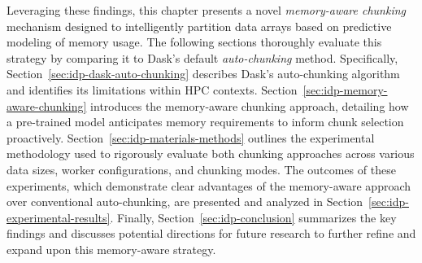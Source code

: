 Leveraging these findings, this chapter presents a novel \emph{memory-aware chunking} mechanism designed to intelligently partition data arrays based on predictive modeling of memory usage.
The following sections thoroughly evaluate this strategy by comparing it to Dask's default \emph{auto-chunking} method.
Specifically, Section~\ref{sec:idp-dask-auto-chunking} describes Dask's auto-chunking algorithm and identifies its limitations within \ac{HPC} contexts.
Section~\ref{sec:idp-memory-aware-chunking} introduces the memory-aware chunking approach, detailing how a pre-trained model anticipates memory requirements to inform chunk selection proactively.
Section~\ref{sec:idp-materials-methods} outlines the experimental methodology used to rigorously evaluate both chunking approaches across various data sizes, worker configurations, and chunking modes.
The outcomes of these experiments, which demonstrate clear advantages of the memory-aware approach over conventional auto-chunking, are presented and analyzed in Section~\ref{sec:idp-experimental-results}.
Finally, Section~\ref{sec:idp-conclusion} summarizes the key findings and discusses potential directions for future research to further refine and expand upon this memory-aware strategy.